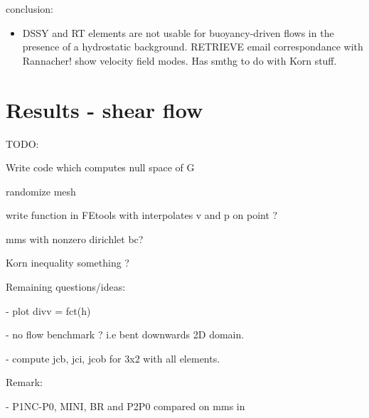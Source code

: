 conclusion:

\begin{itemize}
\item DSSY and RT elements are not usable for buoyancy-driven flows in the presence of a hydrostatic 
background. RETRIEVE email correspondance with Rannacher! show velocity field modes. Has smthg to do with 
Korn stuff.
\end{itemize}

\newpage
\section*{Results - shear flow}

\newpage
TODO:

Write code which computes null space of G 

randomize mesh

write function in FEtools with interpolates v and p on point ?

mms with nonzero dirichlet bc?

Korn inequality something ?

Remaining questions/ideas:


- plot divv = fct(h)

- no flow benchmark ? i.e bent downwards 2D domain. 

- compute jcb, jci, jcob for 3x2 with all elements.

Remark:

- P1NC-P0, MINI, BR and P2P0 compared on mms in \cite{cakp15}



